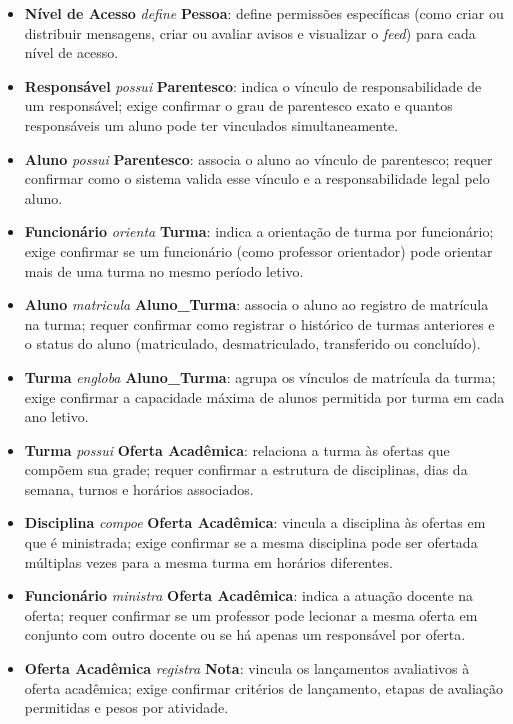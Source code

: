 \documentclass[a4paper,12pt]{report}
\begin{document}
\begin{itemize}
    \item \textbf{Nível de Acesso} \textit{define} \textbf{Pessoa}: define permissões específicas (como criar ou distribuir mensagens, criar ou avaliar avisos e visualizar o \textit{feed}) para cada nível de acesso.
    \item \textbf{Responsável} \textit{possui} \textbf{Parentesco}: indica o vínculo de responsabilidade de um responsável; exige confirmar o grau de parentesco exato e quantos responsáveis um aluno pode ter vinculados simultaneamente.
    \item \textbf{Aluno} \textit{possui} \textbf{Parentesco}: associa o aluno ao vínculo de parentesco; requer confirmar como o sistema valida esse vínculo e a responsabilidade legal pelo aluno.
    \item \textbf{Funcionário} \textit{orienta} \textbf{Turma}: indica a orientação de turma por funcionário; exige confirmar se um funcionário (como professor orientador) pode orientar mais de uma turma no mesmo período letivo.
    \item \textbf{Aluno} \textit{matricula} \textbf{Aluno\_Turma}: associa o aluno ao registro de matrícula na turma; requer confirmar como registrar o histórico de turmas anteriores e o status do aluno (matriculado, desmatriculado, transferido ou concluído).
    \item \textbf{Turma} \textit{engloba} \textbf{Aluno\_Turma}: agrupa os vínculos de matrícula da turma; exige confirmar a capacidade máxima de alunos permitida por turma em cada ano letivo.
    \item \textbf{Turma} \textit{possui} \textbf{Oferta Acadêmica}: relaciona a turma às ofertas que compõem sua grade; requer confirmar a estrutura de disciplinas, dias da semana, turnos e horários associados.
    \item \textbf{Disciplina} \textit{compoe} \textbf{Oferta Acadêmica}: vincula a disciplina às ofertas em que é ministrada; exige confirmar se a mesma disciplina pode ser ofertada múltiplas vezes para a mesma turma em horários diferentes.
    \item \textbf{Funcionário} \textit{ministra} \textbf{Oferta Acadêmica}: indica a atuação docente na oferta; requer confirmar se um professor pode lecionar a mesma oferta em conjunto com outro docente ou se há apenas um responsável por oferta.
    \item \textbf{Oferta Acadêmica} \textit{registra} \textbf{Nota}: vincula os lançamentos avaliativos à oferta acadêmica; exige confirmar critérios de lançamento, etapas de avaliação permitidas e pesos por atividade.

\end{itemize}
\end{document}
